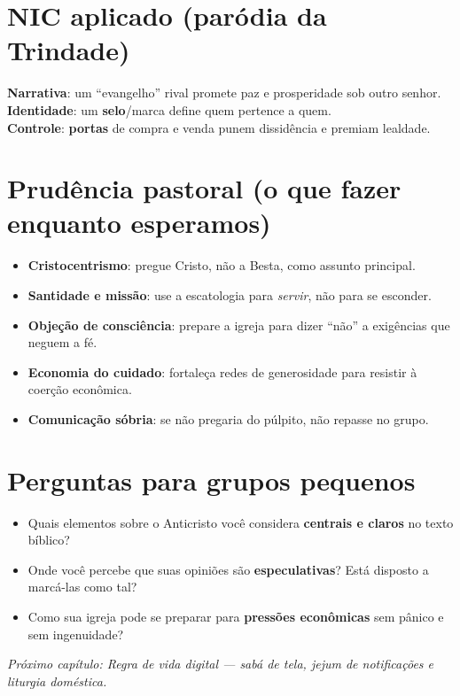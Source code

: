 \section{NIC aplicado (paródia da Trindade)}
\begin{nicbox}
\textbf{Narrativa}: um ``evangelho'' rival promete paz e prosperidade sob outro senhor.\\
\textbf{Identidade}: um \textbf{selo}/marca define quem pertence a quem.\\
\textbf{Controle}: \textbf{portas} de compra e venda punem dissidência e premiam lealdade.
\end{nicbox}

\section{Prudência pastoral (o que fazer enquanto esperamos)}
\begin{checklist}[title={Testes práticos para líderes e membros},breakable]
\begin{itemize}[leftmargin=*,noitemsep]
  \item \textbf{Cristocentrismo}: pregue Cristo, não a Besta, como assunto principal.
  \item \textbf{Santidade e missão}: use a escatologia para \emph{servir}, não para se esconder.
  \item \textbf{Objeção de consciência}: prepare a igreja para dizer ``não'' a exigências que neguem a fé.
  \item \textbf{Economia do cuidado}: fortaleça redes de generosidade para resistir à coerção econômica.
  \item \textbf{Comunicação sóbria}: se não pregaria do púlpito, não repasse no grupo.
\end{itemize}
\end{checklist}

\section{Perguntas para grupos pequenos}
\begin{itemize}[leftmargin=*,noitemsep]
  \item Quais elementos sobre o Anticristo você considera \textbf{centrais e claros} no texto bíblico?
  \item Onde você percebe que suas opiniões são \textbf{especulativas}? Está disposto a marcá-las como tal?
  \item Como sua igreja pode se preparar para \textbf{pressões econômicas} sem pânico e sem ingenuidade?
\end{itemize}

\bigskip
\noindent\textit{Próximo capítulo: Regra de vida digital — sabá de tela, jejum de notificações e liturgia doméstica.}
